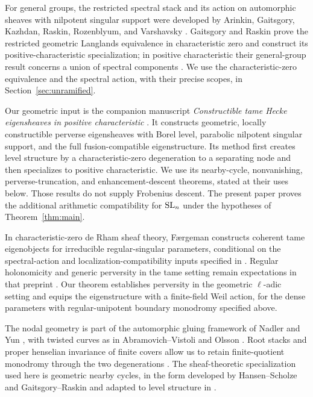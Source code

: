 For general groups, the restricted spectral stack and its action on
automorphic sheaves with nilpotent singular support were developed by
Arinkin, Gaitsgory, Kazhdan, Raskin, Rozenblyum, and Varshavsky
\cite{AGKRRV}. Gaitsgory and Raskin prove the restricted geometric
Langlands equivalence in characteristic zero and construct its
positive-characteristic specialization; in positive characteristic their
general-group result concerns a union of spectral components
\cite{GR}. We use the characteristic-zero equivalence and the spectral
action, with their precise scopes, in Section~\ref{sec:unramified}.

Our geometric input is the companion manuscript
\emph{Constructible tame Hecke eigensheaves in positive characteristic}
\cite{CT}. It constructs geometric, locally constructible perverse
eigensheaves with Borel level, parabolic nilpotent singular support, and
the full fusion-compatible eigenstructure. Its method first creates level
structure by a characteristic-zero degeneration to a separating node and
then specializes to positive characteristic. We use its nearby-cycle,
nonvanishing, perverse-truncation, and enhancement-descent theorems, stated
at their uses below. Those results do not supply Frobenius descent.
The present paper proves the additional arithmetic compatibility for
$\mathrm{SL}_n$ under the hypotheses of Theorem~\ref{thm:main}.

In characteristic-zero de Rham sheaf theory, F\ae rgeman constructs
coherent tame eigenobjects for irreducible regular-singular parameters,
conditional on the spectral-action and localization-compatibility inputs
specified in \cite[Sections~1.3.6--1.4.3]{Faergeman}. Regular holonomicity
and generic perversity in the tame setting remain expectations in that
preprint \cite[Remark~1.4.1.2]{Faergeman}. Our theorem establishes
perversity in the geometric $\ell$-adic setting and equips the
eigenstructure with a finite-field Weil action, for the dense parameters
with regular-unipotent boundary monodromy specified above.

The nodal geometry is part of the automorphic gluing framework of Nadler
and Yun \cite{NYAutomorphicGluing}, with twisted curves as in
Abramovich--Vistoli and Olsson \cite{AbramovichVistoli,OlssonTwisted}.
Root stacks and proper henselian invariance
of finite covers allow us to retain finite-quotient monodromy through the
two degenerations \cite{LieblichOlsson,Rydh}. The sheaf-theoretic
specialization used here is geometric nearby cycles, in the form developed
by Hansen--Scholze and Gaitsgory--Raskin and adapted to level structure
in \cite{CT,HansenScholze,GR}.

